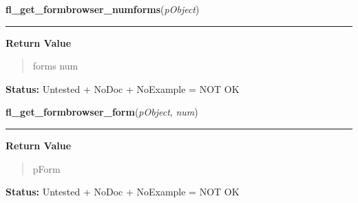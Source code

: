     \label{xformslib:library:fl_get_formbrowser_numforms}

    \vspace{0.5ex}

\hspace{.8\funcindent}\begin{boxedminipage}{\funcwidth}

    \raggedright \textbf{fl\_get\_formbrowser\_numforms}(\textit{pObject})

    \vspace{-1.5ex}

    \rule{\textwidth}{0.5\fboxrule}
\setlength{\parskip}{2ex}
\setlength{\parskip}{1ex}
      \textbf{Return Value}
    \vspace{-1ex}

      \begin{quote}
      forms num

      \end{quote}

\textbf{Status:} Untested + NoDoc + NoExample = NOT OK



    \end{boxedminipage}

    \label{xformslib:library:fl_get_formbrowser_form}

    \vspace{0.5ex}

\hspace{.8\funcindent}\begin{boxedminipage}{\funcwidth}

    \raggedright \textbf{fl\_get\_formbrowser\_form}(\textit{pObject}, \textit{num})

    \vspace{-1.5ex}

    \rule{\textwidth}{0.5\fboxrule}
\setlength{\parskip}{2ex}
\setlength{\parskip}{1ex}
      \textbf{Return Value}
    \vspace{-1ex}

      \begin{quote}
      pForm

      \end{quote}

\textbf{Status:} Untested + NoDoc + NoExample = NOT OK



    \end{boxedminipage}

